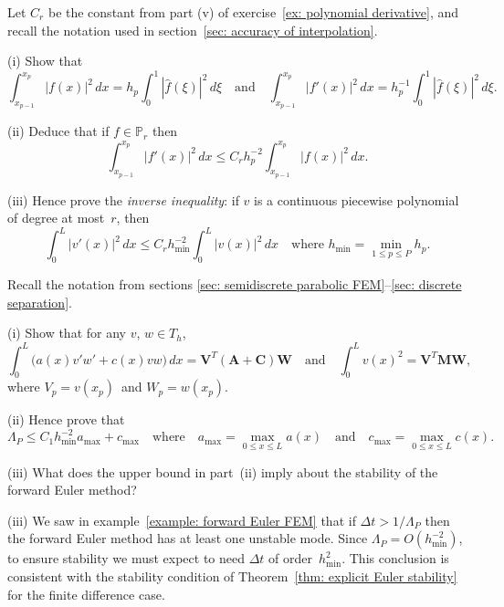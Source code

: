 \begin{Exercises}
\exercise
Let $C_r$ be the constant from part (v) of 
exercise~\ref{ex: polynomial derivative}, and recall the notation used in 
section~\ref{sec: accuracy of interpolation}.
\begin{description}
\item{(i)} Show that 
\[
\int_{x_{p-1}}^{x_p}|f(x)|^2\,dx=h_p\int_0^1|\hat f(\xi)|^2\,d\xi
\quad\text{and}\quad
\int_{x_{p-1}}^{x_p}|f'(x)|^2\,dx=h_p^{-1}\int_0^1|\hat f(\xi)|^2\,d\xi.
\]
\item{(ii)} Deduce that if $f\in\mathbb{P}_r$ then
\[
\int_{x_{p-1}}^{x_p}|f'(x)|^2\,dx
    \le C_rh_p^{-2}\int_{x_{p-1}}^{x_p}|f(x)|^2\,dx.
\]
\item{(iii)} Hence prove the \emph{inverse inequality}: if $v$ is a continuous 
piecewise polynomial of degree at most~$r$, then
\[
\int_0^L|v'(x)|^2\,dx\le C_rh_{\min}^{-2}\int_0^L|v(x)|^2\,dx
\quad\text{where $h_{\min}=\min_{1\le p\le P}h_p$.}
\]
\end{description}

\exercise
Recall the notation from sections 
\ref{sec: semidiscrete parabolic FEM}--\ref{sec: discrete separation}.
\begin{description}
\item{(i)}
Show that for any $v$, $w\in T_h$,
\[
\int_0^L\bigl(a(x)v'w'+c(x)vw\bigr)\,dx
    =\boldsymbol{V}^T(\boldsymbol{A}+\boldsymbol{C})\boldsymbol{W}
\quad\text{and}\quad
\int_0^Lv(x)^2=\boldsymbol{V}^T\boldsymbol{M}\boldsymbol{W},
\]
where $V_p=v(x_p)$~and $W_p=w(x_p)$.  
\item{(ii)}
Hence prove that
\[
\Lambda_P\le C_1h_{\min}^{-2}a_{\max}+c_{\max}\quad\text{where}\quad
a_{\max}=\max_{0\le x\le L}a(x)\quad\text{and}\quad
c_{\max}=\max_{0\le x\le L}c(x).
\]
\item{(iii)}
What does the upper bound in part~(ii) imply about the stability of the forward 
Euler method?
\end{description}
\begin{ans}
(iii) We saw in example~\ref{example: forward Euler FEM} that if $\Delta 
t>1/\Lambda_P$ then the forward Euler method has at least one unstable mode.  
Since $\Lambda_P=O(h_{\min}^{-2})$, to ensure stability we must expect to need 
$\Delta t$ of order~$h_{\min}^2$.  This conclusion is consistent with the 
stability condition of Theorem~\ref{thm: explicit Euler stability} for the 
finite difference case.
\end{ans}

\end{Exercises}



